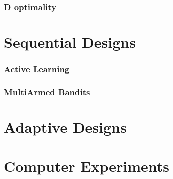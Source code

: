 \subsubsection{D optimality}




\section{Sequential Designs}

\subsubsection{Active Learning}


\subsubsection{MultiArmed Bandits}




\section{Adaptive Designs}



\section{Computer Experiments}

